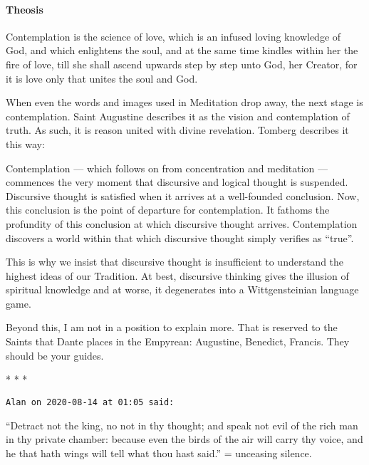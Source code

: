 \paragraph{Theosis}
\begin{quotex}
Contemplation is the science of love, which is an infused loving knowledge of God, and which enlightens the soul, and at the same time kindles within her the fire of love, till she shall ascend upwards step by step unto God, her Creator, for it is love only that unites the soul and God. 

\end{quotex}
When even the words and images used in Meditation drop away, the next stage is contemplation. Saint Augustine describes it as the vision and contemplation of truth. As such, it is reason united with divine revelation. Tomberg describes it this way:

\begin{quotex}
Contemplation — which follows on from concentration and meditation — commences the very moment that discursive and logical thought is suspended. Discursive thought is satisfied when it arrives at a well-founded conclusion. Now, this conclusion is the point of departure for contemplation. It fathoms the profundity of this conclusion at which discursive thought arrives. Contemplation discovers a world within that which discursive thought simply verifies as “true”. 

\end{quotex}
This is why we insist that discursive thought is insufficient to understand the highest ideas of our Tradition. At best, discursive thinking gives the illusion of spiritual knowledge and at worse, it degenerates into a Wittgensteinian language game.

Beyond this, I am not in a position to explain more. That is reserved to the Saints that Dante places in the Empyrean: Augustine, Benedict, Francis. They should be your guides.




\begin{center}* * *\end{center}

\begin{footnotesize}\begin{sffamily}



\texttt{Alan on 2020-08-14 at 01:05 said: }

“Detract not the king, no not in thy thought; and speak not evil of the rich man in thy private chamber: because even the birds of the air will carry thy voice, and he that hath wings will tell what thou hast said.” = unceasing silence.


\end{sffamily}\end{footnotesize}
